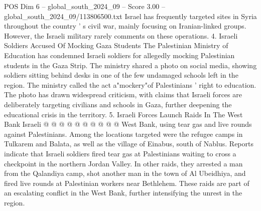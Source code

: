 \begin{textsample}{POS Dim 6 – global\_south\_2024\_09 – Score 3.00 – global\_south\_2024\_09/113806500.txt}
Israel has frequently targeted sites in Syria throughout the country ' s civil war, mainly focusing on Iranian-linked groups.
However, the Israeli military rarely comments on these operations. 4.
Israeli Soldiers Accused Of Mocking Gaza Students The Palestinian Ministry of Education has condemned Israeli soldiers for allegedly mocking Palestinian students in the Gaza Strip.
The ministry shared a photo on social media, showing soldiers sitting behind desks in one of the few undamaged schools left in the region.
The ministry called the act a"mockery"of Palestinians ' right to education.
The photo has drawn widespread criticism, with claims that Israeli forces are deliberately targeting civilians and schools in Gaza, further deepening the educational crisis in the territory. 5.
Israeli Forces Launch Raids In The West Bank Israeli @ @ @ @ @ @ @ @ @ @ West Bank, using tear gas and live rounds against Palestinians.
Among the locations targeted were the refugee camps in Tulkarem and Balata, as well as the village of Einabus, south of Nablus.
Reports indicate that Israeli soldiers fired tear gas at Palestinians waiting to cross a checkpoint in the northern Jordan Valley.
In other raids, they arrested a man from the Qalandiya camp, shot another man in the town of Al Ubeidhiya, and fired live rounds at Palestinian workers near Bethlehem.
These raids are part of an escalating conflict in the West Bank, further intensifying the unrest in the region.

\end{textsample}
